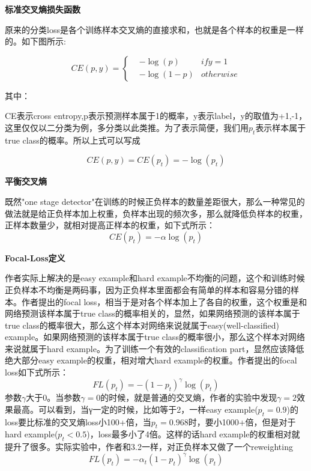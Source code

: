 \textbf{标准交叉熵损失函数}

原来的分类loss是各个训练样本交叉熵的直接求和，也就是各个样本的权重是一样的。如下图所示:

\begin{equation}
CE(p,y)=\left\{
\begin{aligned}
& -\log (p) 	&if y = 1\\
& -\log (1-p) 	&otherwise
\end{aligned}
\right.
\end{equation}

其中：

CE表示cross entropy,p表示预测样本属于1的概率，y表示label，y的取值为{+1,-1}，这里仅仅以二分类为例，多分类以此类推。为了表示简便，我们用$p_t$表示样本属于true class的概率。所以上式可以写成

\[
	CE(p,y) = CE(p_t) = -\log (p_t)
\]

\textbf{平衡交叉熵}

既然"one stage detector"在训练的时候正负样本的数量差距很大，那么一种常见的做法就是给正负样本加上权重，负样本出现的频次多，那么就降低负样本的权重，正样本数量少，就相对提高正样本的权重，如下式所示：
\[
	CE(p_t) = -\alpha \log (p_t)
\]

\textbf{Focal-Loss定义}

作者实际上解决的是easy example和hard example不均衡的问题，这个和训练时候正负样本不均衡是两码事，因为正负样本里面都会有简单的样本和容易分错的样本。作者提出的focal loss，相当于是对各个样本加上了各自的权重，这个权重是和网络预测该样本属于true class的概率相关的，显然，如果网络预测的该样本属于true class的概率很大，那么这个样本对网络来说就属于easy(well-classified) example。如果网络预测的该样本属于true class的概率很小，那么这个样本对网络来说就属于hard example。为了训练一个有效的classification part，显然应该降低绝大部分easy example的权重，相对增大hard example的权重。作者提出的focal loss如下式所示： 
\[
	FL(p_t) = -(1 - p_t)^\gamma \log (p_t)
\]
参数$\gamma$大于0。当参数$\gamma = 0$的时候，就是普通的交叉熵，作者的实验中发现$\gamma = 2$效果最高。可以看到，当γ一定的时候，比如等于2，一样easy example($p_t = 0.9$)的loss要比标准的交叉熵loss小100+倍，当$p_t=0.968$时，要小1000+倍，但是对于hard example($p_t < 0.5$)，loss最多小了4倍。这样的话hard example的权重相对就提升了很多。实际实验中，作者和3.2一样，对正负样本又做了一个reweighting 
\[
	FL(p_t) = -\alpha _t(1 - p_t)^\gamma \log (p_t)
\]
